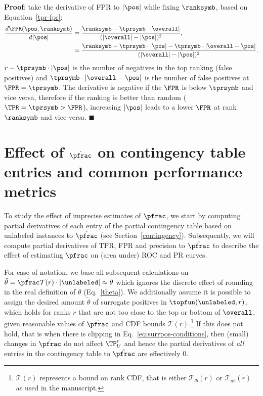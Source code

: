 \begin{lemma}
\textbf{Proof}: take the derivative of FPR to $|\pos|$ while fixing $\ranksymb$, based on Equation~\eqref{tpr-fpr}:
\begin{align}
\frac{d\FPR(\pos, \ranksymb)}{d|\pos|} &= \frac{\ranksymb-\tprsymb\cdot|\overall|}{(|\overall|-|\pos|)^2}, \nonumber \\
&= \frac{\ranksymb-\tprsymb\cdot|\pos| - \tprsymb \cdot|\overall-\pos|}{(|\overall|-|\pos|)^2}. \label{FPR_ifv_gamma}
\end{align}
$r-\tprsymb\cdot|\pos|$ is the number of negatives in the top ranking (false positives) and $\tprsymb\cdot|\overall - \pos|$ is the number of false positives at $\FPR=\tprsymb$. The derivative is negative if the $\FPR$ is below $\tprsymb$ and vice versa, therefore if the ranking is better than random ($\TPR = \tprsymb > \FPR$), increasing $|\pos|$ leads to a lower $\FPR$ at rank $\ranksymb$ and vice versa. \hfill $\blacksquare$
\end{lemma}

\section{Effect of $\hat{\pfrac}$ on contingency table entries and common performance metrics} \label{partial}
To study the effect of imprecise estimates of $\pfrac$, we start by computing partial derivatives of each entry of the partial contingency table based on unlabeled instances to $\hat{\pfrac}$ (see Section~\ref{contingency}). Subsequently, we will compute partial derivatives of TPR, FPR and precision to $\hat{\pfrac}$ to describe the effect of estimating $\pfrac$ on (area under) ROC and PR curves.

For ease of notation, we base all subsequent calculations on $\tilde{\theta} = \hat{\pfrac} \mathcal{T}(r) \cdot |\unlabeled| \approx \theta$ which ignores the discrete effect of rounding in the real definition of $\theta$ (Eq.~\ref{theta}). We additionally assume it is possible to assign the desired amount $\tilde{\theta}$ of surrogate positives in $\topfun(\unlabeled, r)$, which holds for ranks $r$ that are not too close to the top or bottom of $\overall$, given reasonable values of $\hat{\pfrac}$ and CDF bounds $\mathcal{T}(r)$.\footnote{$\mathcal{T}(r)$ represents a bound on rank CDF, that is either $\mathcal{T}_{lb}(r)$ or $\mathcal{T}_{ub}(r)$ as used in the manuscript.} If this does not hold, that is when there is clipping in Eq.~\ref{eq:surrpos-conditions}, then (small) changes in $\hat{\pfrac}$ do not affect $\TP_U^r$ and hence the partial derivatives of \emph{all} entries in the contingency table to $\hat{\pfrac}$ are effectively 0.

